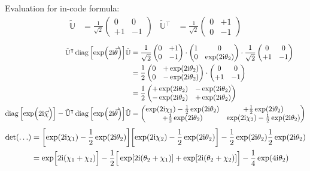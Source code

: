 \documentclass[
	english,
	a4paper,
	fontsize=10pt,
	parskip=half,
	titlepage=true,
	DIV=12,
	final
]{scrreprt}
\newcommand*{\transp}{\ensuremath{^\intercal}}
\newcommand*{\iunit}{\ensuremath{\mathrm{i}}}
\DeclareMathOperator{\diag}{diag}
\begin{document}
Evaluation for in-code formula:
\begin{align*}
	\tilde{\mathbb{U}}
&=
	\frac{1}{\sqrt{2}}
	\begin{pmatrix}
		 0 &  0 \\
		+1 & -1
	\end{pmatrix}
&
	\tilde{\mathbb{U}}\transp
&=
	\frac{1}{\sqrt{2}}
	\begin{pmatrix}
		0 & +1 \\
		0 & -1
	\end{pmatrix}
\end{align*}
\begin{align*}
	\tilde{\mathbb{U}}\transp
	\diag\qty[\exp(2\iunit\vec{\theta})]
	\tilde{\mathbb{U}}
&=
	\frac{1}{\sqrt{2}}
	\begin{pmatrix}
		0 & +1 \\
		0 & -1
	\end{pmatrix}
	\cdot
	\begin{pmatrix}
		1 & 0 \\
		0 & \exp(2\iunit \theta_2)
	\end{pmatrix}
	\cdot
	\frac{1}{\sqrt{2}}
	\begin{pmatrix}
		 0 &  0 \\
		+1 & -1
	\end{pmatrix} \\
&=
	\frac{1}{2}
	\begin{pmatrix}
		0 & +\exp(2\iunit \theta_2) \\
		0 & -\exp(2\iunit \theta_2)
	\end{pmatrix}
	\cdot
	\begin{pmatrix}
		 0 &  0 \\
		+1 & -1
	\end{pmatrix} \\
&=
	\frac{1}{2}
	\begin{pmatrix}
		+\exp(2\iunit \theta_2)	&	-\exp(2\iunit \theta_2) \\
		-\exp(2\iunit \theta_2)	&	+\exp(2\iunit \theta_2)
	\end{pmatrix}
\\
	\diag\qty[\exp(\Big.2\iunit\vec{\chi})]
	-
	\tilde{\mathbb{U}}\transp
	\diag\qty[\exp(2\iunit\vec{\theta})]
	\tilde{\mathbb{U}}
&=
	\begin{pmatrix}
		\exp(2\iunit \chi_1) - \frac{1}{2}\exp(2\iunit \theta_2)	&
		+\frac{1}{2}\exp(2\iunit \theta_2)
		\\
		+\frac{1}{2}\exp(2\iunit \theta_2)	&
		\exp(2\iunit \chi_2) - \frac{1}{2}\exp(2\iunit \theta_2)
	\end{pmatrix}
\end{align*}
\begin{align*}
	\det(\ldots)
&=
	\qty[ \exp(2\iunit \chi_1) - \frac{1}{2}\exp(2\iunit \theta_2) ]
	\qty[ \exp(2\iunit \chi_2) - \frac{1}{2}\exp(2\iunit \theta_2) ]
	-
	\frac{1}{2}\exp(2\iunit \theta_2)
	\frac{1}{2}\exp(2\iunit \theta_2) \\
&=
	\exp[ \Big. 2\iunit (\chi_1 + \chi_2) ]
	-\frac{1}{2} \qty[ \Big.
		\exp[2\iunit (\theta_2 + \chi_1)] +
		\exp[2\iunit (\theta_2 + \chi_2)]
	]
	-
	\frac{1}{4}\exp(4\iunit \theta_2)
\end{align*}
\end{document}
